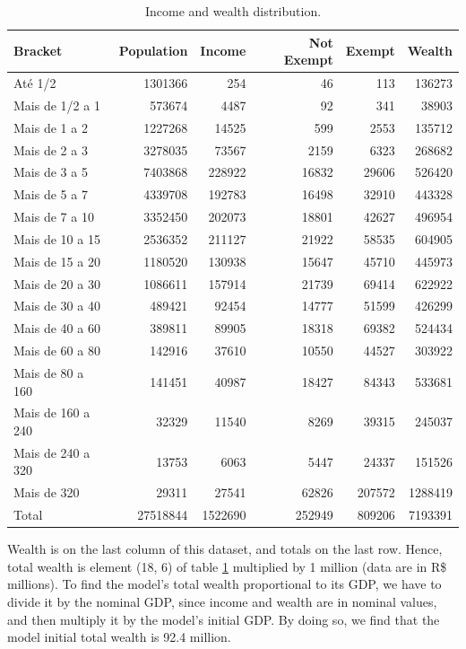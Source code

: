 \documentclass[11pt,]{article}
\begin{document}
\begin{table}

\caption{\label{tab:unnamed-chunk-16}\label{tab:income}Income and wealth distribution.}
\centering
\begin{tabular}[t]{lrrrrr}
\toprule
Bracket & Population & Income & Not Exempt & Exempt & Wealth\\
\midrule
Até 1/2 & 1301366 & 254 & 46 & 113 & 136273\\
Mais de 1/2 a 1 & 573674 & 4487 & 92 & 341 & 38903\\
Mais de 1 a 2 & 1227268 & 14525 & 599 & 2553 & 135712\\
Mais de 2 a 3 & 3278035 & 73567 & 2159 & 6323 & 268682\\
Mais de 3 a 5 & 7403868 & 228922 & 16832 & 29606 & 526420\\
Mais de 5 a 7 & 4339708 & 192783 & 16498 & 32910 & 443328\\
Mais de 7 a 10 & 3352450 & 202073 & 18801 & 42627 & 496954\\
Mais de 10 a 15 & 2536352 & 211127 & 21922 & 58535 & 604905\\
Mais de 15 a 20 & 1180520 & 130938 & 15647 & 45710 & 445973\\
Mais de 20 a 30 & 1086611 & 157914 & 21739 & 69414 & 622922\\
Mais de 30 a 40 & 489421 & 92454 & 14777 & 51599 & 426299\\
Mais de 40 a 60 & 389811 & 89905 & 18318 & 69382 & 524434\\
Mais de 60 a 80 & 142916 & 37610 & 10550 & 44527 & 303922\\
Mais de 80 a 160 & 141451 & 40987 & 18427 & 84343 & 533681\\
Mais de 160 a 240 & 32329 & 11540 & 8269 & 39315 & 245037\\
Mais de 240 a 320 & 13753 & 6063 & 5447 & 24337 & 151526\\
Mais de 320 & 29311 & 27541 & 62826 & 207572 & 1288419\\
Total & 27518844 & 1522690 & 252949 & 809206 & 7193391\\
\bottomrule
\end{tabular}
\end{table}

Wealth is on the last column of this dataset, and totals on the last
row. Hence, total wealth is element (18, 6) of table \ref{tab:income}
multiplied by 1 million (data are in R\$ millions). To find the model's
total wealth proportional to its GDP, we have to divide it by the
nominal GDP, since income and wealth are in nominal values, and then
multiply it by the model's initial GDP. By doing so, we find that the
model initial total wealth is 92.4 million.
\end{document}
